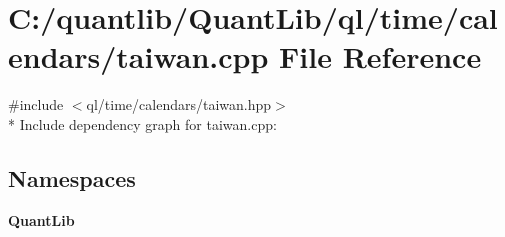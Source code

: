 \section{C\+:/quantlib/\+Quant\+Lib/ql/time/calendars/taiwan.cpp File Reference}
\label{taiwan_8cpp}
{\ttfamily \#include $<$ql/time/calendars/taiwan.\+hpp$>$}\\*
Include dependency graph for taiwan.\+cpp\+:
\subsection*{Namespaces}
\begin{DoxyCompactItemize}
\item 
 {\bf Quant\+Lib}
\end{DoxyCompactItemize}
